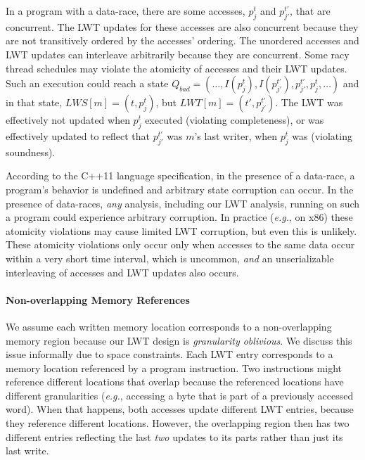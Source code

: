 \documentclass[preprint,9pt]{sigplanconf}
\newcommand{\lwt}{LWT\xspace}
\begin{document}
In a program with a data-race, there are some accesses, $p^{t}_{j}$ and
$p^{t'}_{j'}$, that are concurrent.  The \lwt updates for these accesses are
also concurrent because they are not transitively ordered by the accesses' ordering.  The unordered accesses and \lwt updates can interleave arbitrarily
because they are concurrent.  Some racy thread schedules may violate the
atomicity of accesses and their \lwt updates.  Such an execution could reach a
state $Q_{bad} = (\ldots, I(p^{t}_{j}), I(p^{t'}_{j'}), p^{t'}_{j'}, p^{t}_{j},
\ldots)$ and in that state, $LWS[m] = (t,p^{t}_{j})$, but $LWT[m] =
(t',p^{t'}_{j'})$.  The \lwt was effectively not updated when $p^{t}_{j}$
executed (violating completeness), or was effectively updated to reflect that
$p^{t'}_{j'}$ was $m$'s last writer, when $p^{t}_{j}$ was (violating
soundness).    

According to the C++11 language specification, in the presence of a data-race,
a program's behavior is undefined and arbitrary state corruption can occur.  In
the presence of data-races, {\em any} analysis, including our \lwt analysis,
running on such a program could experience arbitrary corruption.  In practice
({\em e.g.}, on x86) these atomicity violations may cause limited \lwt
corruption, but even this is unlikely.  These atomicity violations only occur
only when accesses to the same data occur within a very short time interval,
which is uncommon, {\em and} an unserializable interleaving of accesses and
\lwt updates also occurs.





\paragraph{Non-overlapping Memory References} 
We assume each written memory location corresponds to a non-overlapping memory
region because our \lwt design is {\em granularity oblivious}.  We discuss this
issue informally due to space constraints.  Each \lwt entry corresponds to a
memory location referenced by a program instruction.  Two instructions might
reference different locations that overlap because the referenced locations
have different granularities ({\em e.g.}, accessing a byte that is part of a
previously accessed word).  When that happens, both accesses update different
\lwt entries, because they reference different locations.  However, the
overlapping region then has two different entries reflecting the last {\em two}
updates to its parts rather than just its last write.
\end{document}
